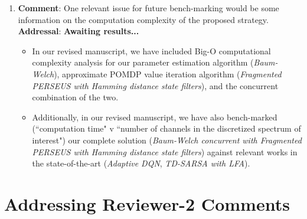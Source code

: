 \documentclass{article}
\begin{document}
\begin{enumerate}
    \item \textbf{Comment}: One relevant issue for future bench-marking would be some information on the computation complexity of the proposed strategy.\\
    \textbf{Addressal}: \textbf{Awaiting results...} 
    \begin{itemize}
        \item In our revised manuscript, we have included Big-O computational complexity analysis for our parameter estimation algorithm (\textit{Baum-Welch}), approximate POMDP value iteration algorithm (\textit{Fragmented PERSEUS with Hamming distance state filters}), and the concurrent combination of the two. 
        \item Additionally, in our revised manuscript, we have also bench-marked (``computation time" v ``number of channels in the discretized spectrum of interest") our complete solution (\textit{Baum-Welch concurrent with Fragmented PERSEUS with Hamming distance state filters}) against relevant works in the state-of-the-art (\textit{Adaptive DQN}, \textit{TD-SARSA with LFA}).
    \end{itemize}
    
\end{enumerate}

\section{Addressing Reviewer-2 Comments}
\end{document}
